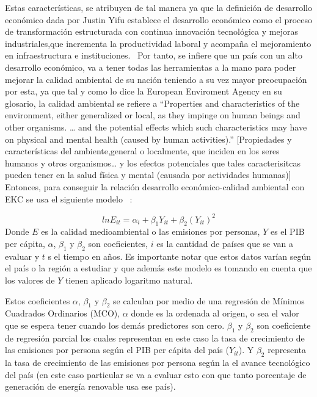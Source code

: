 \documentclass[11 pt]{article}
\begin{document}
Estas características, se atribuyen de tal manera ya que la definición de desarrollo económico dada por Justin Yifu establece el desarrollo económico como el proceso de transformación estructurada con continua innovación tecnológica y mejoras industriales,que incrementa la productividad laboral y acompaña el mejoramiento en infraestructura
e instituciones.~\cite{LIN2017183}
Por tanto, se infiere que un país con un alto desarrollo económico, va a tener todas las herramientas a la mano para poder mejorar la calidad ambiental de su nación teniendo a su vez mayor preocupación por esta, ya que tal y como lo dice la European Enviroment Agency en su glosario, la calidad ambiental se refiere a “Properties and characteristics of the environment, either generalized or local, as they impinge on human beings and other
organisms. … and the potential effects which such characteristics may have on physical and mental health (caused by human activities).” [Propiedades y características del ambiente,general o localmente, que inciden en los seres humanos y otros organismos… y los efectos potenciales que tales caracterisitcas pueden tener en la salud física y mental (causada por actividades humanas)]\cite{eaa}
Entonces, para conseguir la relación desarrollo económico-calidad ambiental con EKC se usa el siguiente modelo ~\cite{sanchez_calidad_2003}:

\begin{equation}\label{eq:ekc}
lnE_{it} = \alpha_i + \beta_1Y_{it} + \beta_2(Y_{it})^2
\end{equation}
Donde $E$ es la calidad medioambiental o las emisiones por personas, $Y$ es el PIB per cápita, $\alpha$, $\beta_1$ y  $\beta_2$ son coeficientes, $i$ es la cantidad de países que se van a evaluar y $t$ s el tiempo en años. Es importante notar que estos datos varían según el país o la región a estudiar y que además este modelo es tomando en cuenta que los valores de $Y$ tienen aplicado logaritmo natural.

Estos coeficientes $\alpha$, $\beta_1$ y  $\beta_2$ se calculan por medio de una regresión de Mínimos Cuadrados
Ordinarios (MCO), $\alpha$ donde es la ordenada al origen, o sea el valor que se espera tener
cuando los demás predictores son cero. $\beta_1$ y  $\beta_2$ son coeficiente de regresión parcial los cuales representan en este caso la tasa de crecimiento de las emisiones por persona según el PIB per cápita del país ($Y_{it}$). Y $\beta_2$ representa la tasa de crecimiento de las emisiones por persona según la el avance tecnológico del país (en este caso particular se va a evaluar esto con que tanto porcentaje de generación de energía renovable usa ese país).
\end{document}
